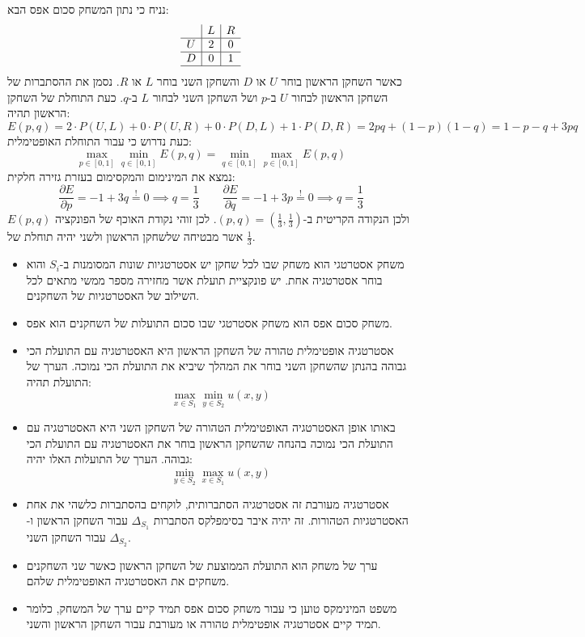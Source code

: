 \documentclass{tstextbook}
\begin{document}
\begin{example}
נניח כי נתון המשחק סכום אפס הבא:
$$\begin{array}{c|c|c}  & L & R\\ \hline  U & 2 & 0\\ \hline D & 0 & 1\\ \hline
\end{array}$$
כאשר השחקן הראשון בוחר \(U\) או \(D\) והשחקן השני בוחר \(L\) או \(R\). נסמן את ההסתברות של השחקן הראשון לבחור \(U\) ב-\(p\) ושל השחקן השני לבחור \(L\) ב-\(q\). כעת התוחלת של השחקן הראשון תהיה:
$$E(p,q)=2\cdot P(U,L)+0\cdot P(U,R)+0\cdot P(D,L)+1 \cdot P(D,R)=2pq+(1-p)(1-q)=1-p-q+3pq$$
כעת נדרוש כי עבור התוחלת האופטימלית:
$$\operatorname*{max}_{p\in[0,1]}\operatorname*{min}_{q\in[0,1]}E(p,q)=\operatorname*{min}_{q\in[0,1]}\operatorname*{max}_{p\in[0,1]}E(p,q)$$
נמצא את המינימום והמקסימום בעזרת גזירה חלקית:
$$\frac{\partial E}{\partial p} =-1+3q\overset{!}{=} 0\implies q=\frac{1}{3}\qquad \frac{\partial E}{\partial q} =-1+3p\overset{!}{=}  0\implies q=\frac{1}{3}$$
ולכן הנקודה הקריטית ב-\((p,q)=\left( \frac{1}{3},\frac{1}{3} \right)\). לכן זוהי נקודת האוכף של הפונקציה \(E(p,q)\) אשר מבטיחה שלשחקן הראשון ולשני יהיה תוחלת של \(\frac{1}{3}\).

\end{example}
\begin{summary}
  \begin{itemize}
    \item משחק אסטרטגי הוא משחק שבו לכל שחקן יש אסטרטגיות שונות המסומנות ב-\(S_{i}\) והוא בוחר אסטרטגיה אחת. יש פונקציית תועלת אשר מחזירה מספר ממשי מתאים לכל השילוב של האסטרטגיות של השחקנים.
    \item משחק סכום אפס הוא משחק אסטרטגי שבו סכום התועלות של השחקנים הוא אפס.
    \item אסטרטגיה אופטימלית טהורה של השחקן הראשון היא האסטרטגיה עם התועלת הכי גבוהה בהנתן שהשחקן השני בוחר את המהלך שיביא את התועלת הכי נמוכה. הערך של התועלת תהיה:
$$\max _{x \in S_{1}}\min _{y \in S_{2}}u(x,y)$$
    \item באותו אופן האסטרטגיה האופטימלית הטהורה של השחקן השני היא האסטרטגיה עם התועלת הכי נמוכה בהנחה שהשחקן הראשון בוחר את האסטרטגיה עם התועלת הכי גבוהה. הערך של התועלות האלו יהיה:
$$\min _{y \in S_{2}}\max _{x \in S_{1}}u(x,y)$$
    \item אסטרטגיה מעורבת זה אסטרטגיה הסתברותית, לוקחים בהסתברות כלשהי את אחת האסטרטגיות הטהורות. זה יהיה איבר בסימפלקס הסתברות \(\Delta_{S_{1}}\) עבור השחקן הראשון ו-\(\Delta_{S_{2}}\) עבור השחקן השני.
    \item ערך של משחק הוא התועלת הממוצעת של השחקן הראשון כאשר שני השחקנים משחקים את האסטרטגיה האופטימלית שלהם.
    \item משפט המינימקס טוען כי עבור משחק סכום אפס תמיד קיים ערך של המשחק, כלומר תמיד קיים אסטרטגיה אופטימלית טהורה או מעורבת עבור השחקן הראשון והשני.
  \end{itemize}
\end{summary}
\end{document}
